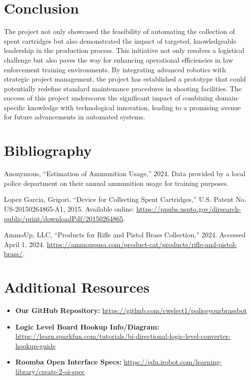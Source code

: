\documentclass{scrarticle}
\begin{document}
\section{Conclusion}
The project not only showcased the feasibility of automating the collection of spent cartridges but also demonstrated the impact of targeted, knowledgeable leadership in the production process. This initiative not only resolves a logistical challenge but also paves the way for enhancing operational efficiencies in law enforcement training environments. By integrating advanced robotics with strategic project management, the project has established a prototype that could potentially redefine standard maintenance procedures in shooting facilities. The success of this project underscores the significant impact of combining domain-specific knowledge with technological innovation, leading to a promising avenue for future advancements in automated systems.

\section{Bibliography}
\begin{thebibliography}{9}
Anonymous, ``Estimation of Ammunition Usage,'' 2024. Data provided by a local police department on their annual ammunition usage for training purposes.

Lopez Garcia, Grigori, ``Device for Collecting Spent Cartridges,'' U.S. Patent No. US-20150264865-A1, 2015. Available online: \url{https://ppubs.uspto.gov/dirsearch-public/print/downloadPdf/20150264865}.

AmmoUp, LLC, ``Products for Rifle and Pistol Brass Collection,'' 2024. Accessed April 1, 2024. \url{https://ammoupusa.com/product-cat/products/rifle-and-pistol-brass/}.
\end{thebibliography}

\section{Additional Resources}
\begin{itemize}
    \item \textbf{Our GitHub Repository:} \url{https://github.com/cwelect1/policeyourbrassbot}
    \item \textbf{Logic Level Board Hookup Info/Diagram:} \url{https://learn.sparkfun.com/tutorials/bi-directional-logic-level-converter-hookup-guide}
    \item \textbf{Roomba Open Interface Specs:} \url{https://edu.irobot.com/learning-library/create-2-oi-spec}
\end{itemize}
\end{document}

